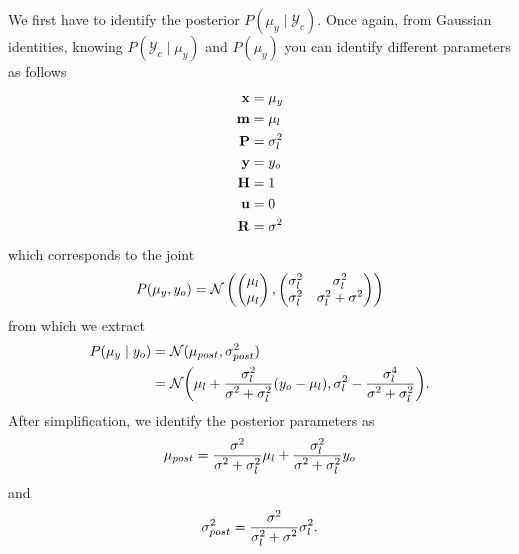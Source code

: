 \documentclass[11pt, a4paper]{article}
\begin{document}
\begin{enumerate}
\begin{solution}
      We first have to identify the posterior $P(\mu_y \mid \mathcal{Y}_c)$.
      Once again, from Gaussian identities, knowing $P(\mathcal{Y}_c \mid \mu_y)$ and $P(\mu_y)$ you can identify different parameters as follows
        \begin{align*}
            \mathbf{x} &= \mu_y\\
            \mathbf{m} &= \mu_l\\
            \mathbf{P} &= \sigma_l^2\\
            \mathbf{y} &= y_o\\
            \mathbf{H} &= 1\\
            \mathbf{u} &= 0\\
            \mathbf{R} &= \text{$\sigma^2$}
      \end{align*}
      which corresponds to the joint
      $$
      P(\mu_y, y_o) = \mathcal{N}
      \begin{pmatrix}
        \begin{pmatrix}
            \mu_l\\
            \mu_l\\
        \end{pmatrix},
        \begin{pmatrix}
            \sigma_l^2 & \sigma_l^2\\
            \sigma_l^2 & \sigma_l^2 + \text{$\sigma^2$}\\
        \end{pmatrix}
    \end{pmatrix}
      $$
      from which we extract 
      \begin{align*}
      P(\mu_y \mid y_o) &= \mathcal{N}(\mu_{post}, \sigma_{post}^2)\\ 
                    &= \mathcal{N}\bigg(\mu_l + \dfrac{\sigma_l^2}{\text{$\sigma^2$} + \sigma_l^2}(y_o - \mu_l), \sigma_l^2 - \dfrac{\sigma_l^4}{\text{$\sigma^2$} + \sigma_l^2}\bigg).
      \end{align*}
      After simplification, we identify the posterior parameters as 
      $$\mu_{post} = \dfrac{\text{$\sigma^2$}}{\text{$\sigma^2$} + \sigma_l^2}\mu_l + \dfrac{\sigma_l^2}{\text{$\sigma^2$} + \sigma_l^2}y_o$$
      and
      $$\sigma_{post}^2 = \dfrac{\text{$\sigma^2$}}{\sigma_l^2 + \text{$\sigma^2$}} \sigma_l^2.$$

\end{solution}
\end{enumerate}
\end{document}
